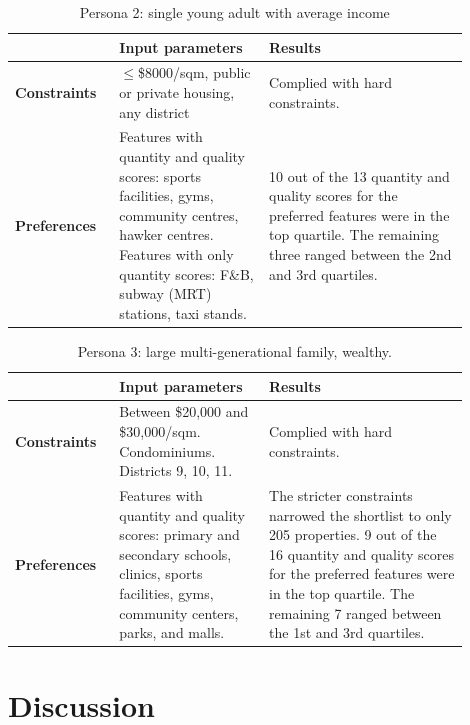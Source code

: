 \documentclass[a4paper, 11pt]{article}
\begin{document}
\begin{table}[ht]
    \centering
    \begin{tabular}{p{0.2\linewidth} | p{0.3\linewidth} | p{0.4\linewidth}} \hline
      & \textbf{Input parameters}  & \textbf{Results} \\ \hline
      \textbf{Constraints}& $\leq$\$8000/sqm, public or private housing, any district & Complied with hard constraints. \\ \hline
\textbf{Preferences} &
Features with quantity and quality scores: sports facilities, gyms, community centres, hawker centres. Features with only quantity scores: F\&B, subway (MRT) stations, taxi stands. &
10 out of the 13 quantity and quality scores for the preferred features were in the top quartile. The remaining three ranged between the 2nd and 3rd quartiles.

 \\\hline
    \end{tabular}
    \caption{Persona 2: single young adult with average income}
    \label{tab:my_label}
\end{table}


\begin{table}[ht]
    \centering
    \begin{tabular}{p{0.2\linewidth} | p{0.3\linewidth} | p{0.4\linewidth}} \hline
      & \textbf{Input parameters}  & \textbf{Results} \\ \hline
      \textbf{Constraints}& Between \$20,000 and \$30,000/sqm. Condominiums. Districts 9, 10, 11.
 & Complied with hard constraints. \\ \hline
\textbf{Preferences} &
Features with quantity and quality scores: primary and secondary schools, clinics, sports facilities, gyms, community centers, parks, and malls. & The stricter constraints narrowed the shortlist to only 205 properties.
9 out of the 16 quantity and quality scores for the preferred features were in the top quartile. The remaining 7 ranged between the 1st and 3rd quartiles.

 \\\hline
    \end{tabular}
    \caption{Persona 3: large multi-generational family, wealthy.
}
    \label{tab:my_label}
\end{table}


\section{Discussion}
\end{document}
